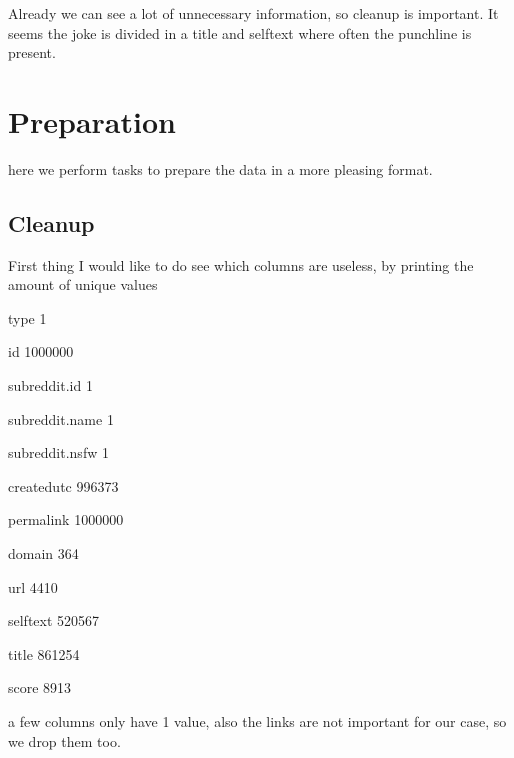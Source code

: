 \documentclass[letterpaper,10pt,english]{jupyterBook}
\begin{document}
\sphinxAtStartPar
Already we can see a lot of unnecessary information, so cleanup is important. It seems the joke is divided in a title and selftext where often the punchline is present.


\section{Preparation}
\label{\detokenize{c7_case_studies/Jokes:preparation}}
\sphinxAtStartPar
here we perform tasks to prepare the data in a more pleasing format.


\subsection{Cleanup}
\label{\detokenize{c7_case_studies/Jokes:cleanup}}
\sphinxAtStartPar
First thing I would like to do see which columns are useless, by printing the amount of unique values

\begin{sphinxVerbatim}[commandchars=\\\{\}]
   
  \PYG{p}{[}\PYG{p}{]}
\end{sphinxVerbatim}

\begin{sphinxVerbatim}[commandchars=\\\{\}]
type
1

id
1000000

subreddit.id
1

subreddit.name
1

subreddit.nsfw
1

created\PYGZus{}utc
996373

permalink
1000000

domain
364

url
4410

selftext
520567

title
861254

score
8913
\end{sphinxVerbatim}

\sphinxAtStartPar
a few columns only have 1 value, also the links are not important for our case, so we drop them too.
\end{document}
